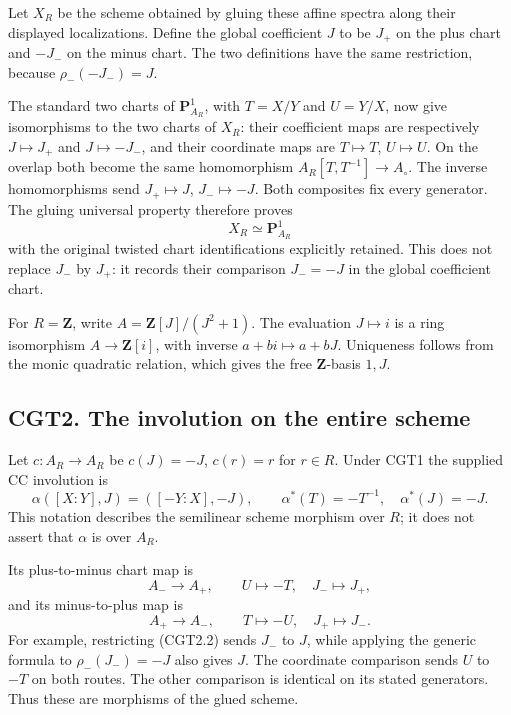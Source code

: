 Let \(X_R\) be the scheme obtained by gluing these affine spectra along
their displayed localizations. Define the global coefficient \(J\) to be
\(J_+\) on the plus chart and \(-J_-\) on the minus chart. The two
definitions have the same restriction, because \(\rho_-(-J_-)=J\).

The standard two charts of \(\mathbf P^1_{A_R}\), with \(T=X/Y\) and
\(U=Y/X\), now give isomorphisms to the two charts of \(X_R\): their
coefficient maps are respectively \(J\mapsto J_+\) and \(J\mapsto-J_-\),
and their coordinate maps are \(T\mapsto T\), \(U\mapsto U\). On the
overlap both become the same homomorphism \(A_R[T,T^{-1}]\to A_\circ\).
The inverse homomorphisms send \(J_+\mapsto J\), \(J_-\mapsto-J\). Both
composites fix every generator. The gluing universal property therefore
proves \[
\boxed{X_R\simeq\mathbf P^1_{A_R}}
\tag{CGT1.3}
\] with the original twisted chart identifications explicitly retained.
This does not replace \(J_-\) by \(J_+\): it records their comparison
\(J_-=-J\) in the global coefficient chart.

For \(R=\mathbf Z\), write \(A=\mathbf Z[J]/(J^2+1)\). The evaluation
\(J\mapsto i\) is a ring isomorphism \(A\to\mathbf Z[i]\), with inverse
\(a+bi\mapsto a+bJ\). Uniqueness follows from the monic quadratic
relation, which gives the free \(\mathbf Z\)-basis \(1,J\).

\subsection{CGT2. The involution on the entire
scheme}\label{cgt2.-the-involution-on-the-entire-scheme}

Let \(c:A_R\to A_R\) be \(c(J)=-J\), \(c(r)=r\) for \(r\in R\). Under
CGT1 the supplied CC involution is \[
\alpha([X:Y],J)=([-Y:X],-J),
\qquad
\alpha^*(T)=-T^{-1},\quad \alpha^*(J)=-J.
\tag{CGT2.1}
\] This notation describes the semilinear scheme morphism over \(R\); it
does not assert that \(\alpha\) is over \(A_R\).

Its plus-to-minus chart map is \[
A_-\longrightarrow A_+,\qquad U\longmapsto-T,\quad J_-\longmapsto J_+,
\tag{CGT2.2}
\] and its minus-to-plus map is \[
A_+\longrightarrow A_-,\qquad T\longmapsto-U,\quad J_+\longmapsto J_-.
\tag{CGT2.3}
\] For example, restricting (CGT2.2) sends \(J_-\) to \(J\), while
applying the generic formula to \(\rho_-(J_-)=-J\) also gives \(J\). The
coordinate comparison sends \(U\) to \(-T\) on both routes. The other
comparison is identical on its stated generators. Thus these are
morphisms of the glued scheme.

